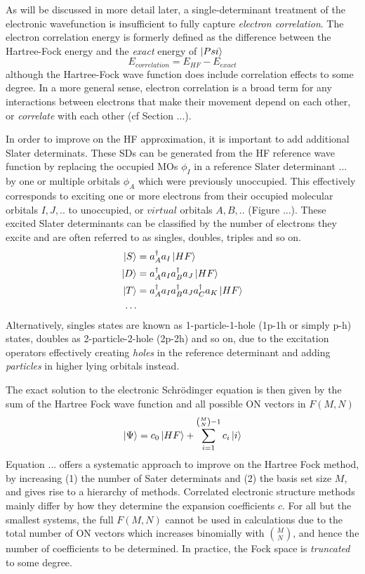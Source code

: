 As will be discussed in more detail later, a single-determinant treatment of the electronic wavefunction is insufficient to fully capture \emph{electron correlation}. The electron correlation energy is formerly defined as the difference between the Hartree-Fock energy and the \emph{exact} energy of $\ket{Psi}$
\begin{equation}
E_{correlation} = E_{HF} - E_{exact}
\end{equation}
\noindent although the Hartree-Fock wave function does include correlation effects to some degree. In a more general sense, electron correlation is a broad term for any interactions between electrons that make their movement depend on each other, or \emph{correlate} with each other (cf Section ...). 

In order to improve on the HF approximation, it is important to add additional Slater determinats. These SDs can be generated from the HF reference wave function by replacing the occupied MOs $\phi_I$ in a reference Slater determinant ... by one or multiple orbitals $\phi_A$ which were previously unoccupied. This effectively corresponds to exciting one or more electrons from their occupied molecular orbitals $I,J,..$ to unoccupied, or $virtual$ orbitals $A,B,..$ (Figure ...). These excited Slater determinants can be classified by the number of electrons they excite and are often referred to as singles, doubles, triples and so on.
\begin{align*}
\ket{S} &= a^{\dagger}_A a_I \ket{HF} \\
\ket{D} &= a^{\dagger}_A a_I a^{\dagger}_B a_J \ket{HF} \\
\ket{T} &= a^{\dagger}_A a_I a^{\dagger}_B a_J a^{\dagger}_C a_K \ket{HF} \\
\ldots &
\end{align*}
\noindent Alternatively, singles states are known as 1-particle-1-hole (1p-1h or simply p-h) states, doubles as 2-particle-2-hole (2p-2h) and so on, due to the excitation operators effectively creating \emph{holes} in the reference determinant and adding \emph{particles} in higher lying orbitals instead. 

The exact solution to the electronic Schrödinger equation is then given by the sum of the Hartree Fock wave function and all possible ON vectors in $F(M,N)$
\begin{equation}
\ket{\Psi} = c_0 \ket{HF} + \sum^{{{M}\choose{N}}-1}_{i=1} c_i  \ket{i} 
\end{equation}  
\noindent Equation ... offers a systematic approach to improve on the Hartree Fock method, by increasing (1) the number of Sater determinats and (2) the basis set size $M$, and gives rise to a hierarchy of methods. Correlated electronic structure methods mainly differ by how they determine the expansion coefficients $c$. For all but the smallest systems, the full $F(M,N)$ cannot be used in calculations due to the total number of ON vectors which increases binomially with ${M}\choose{N}$, and hence the number of coefficients to be determined. In practice, the Fock space is \emph{truncated} to some degree.

